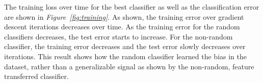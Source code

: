 \documentclass[conference,11pt]{IEEEtran}
\begin{document}
The training loss over time for the best classifier as well as the classification error are shown in \textit{Figure~\ref{fig:training}}. As shown, the training error over gradient descent iterations decreases over time. As the training error for the random classifiers decreases, the test error starts to increase. For the non-random classifier, the training error decreases and the test error slowly decreases over iterations. This result shows how the random classifier learned the bias in the dataset, rather than a generalizable signal as shown by the non-random, feature transferred classifier.

\begin{figure}[htb]
    \centering
    	\hspace{0.02\linewidth}
      \hspace{0mm}
    	\hspace{0.02\linewidth}
\end{figure}
\end{document}
